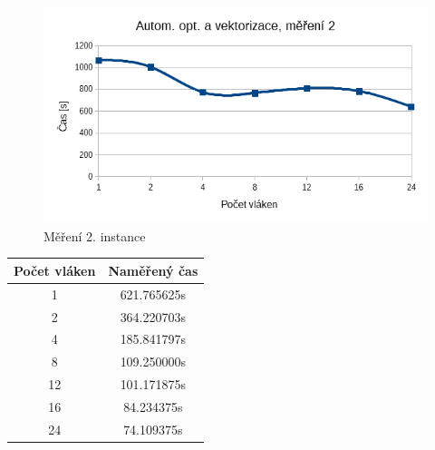 \documentclass[12pt]{article}
\begin{document}
\begin{figure}
  \begin{center}
    \includegraphics[width=12cm]{images/auto2.png}
    \caption{Měření 2. instance} 
  \end{center}
\end{figure}
%
%
\begin{center}
\begin{tabular}{ c | c }
\textbf{Počet vláken} & \textbf{Naměřený čas} \\ \hline \hline 
1 & 621.765625s \\ \hline
2 & 364.220703s \\ \hline
4 & 185.841797s \\ \hline
8 & 109.250000s \\ \hline
12 & 101.171875s \\ \hline
16 & 84.234375s \\ \hline
24 & 74.109375s \\ \hline
\end{tabular}
\end{center}
\end{document}
